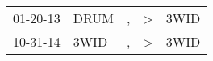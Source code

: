 \begin{supertabular}{p{0.07\textwidth}p{0.06\textwidth}p{0.02\textwidth}p{0.02\textwidth}p{0.06\textwidth}}
 01-20-13\textsuperscript{} &  DRUM\textsuperscript{} &  , &  \textgreater &  3WID\textsuperscript{} \\
 10-31-14\textsuperscript{} &  3WID\textsuperscript{} &  , &  \textgreater &  3WID\textsuperscript{} \\
\end{supertabular}
